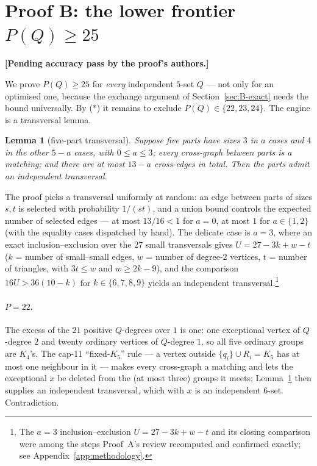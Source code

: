 \documentclass[11pt,reqno]{amsart}
\newtheorem{lemma}[theorem]{Lemma}
\theoremstyle{definition}
\theoremstyle{remark}
\newcommand{\capeleven}{\textsf{cap-11}}
\newcommand{\pendingB}{%
  \par\nobreak\smallskip\noindent
  \textbf{[Pending accuracy pass by the proof's authors.]}\par\smallskip}
\begin{document}
\section{Proof B: the lower frontier \texorpdfstring{$P(Q)\ge 25$}{P(Q)>=25}}\label{sec:B-lower}
\pendingB

We prove $P(Q)\ge 25$ for \emph{every} independent $5$-set $Q$ --- not only for an
optimised one, because the exchange argument of Section~\ref{sec:B-exact} needs the bound
universally. By ($\ast$) it remains to exclude $P(Q)\in\{22,23,24\}$. The engine is a
transversal lemma.

\begin{lemma}[five-part transversal]\label{lem:B-fivepart}
Suppose five parts have sizes $3$ in $a$ cases and $4$ in the other $5-a$ cases, with
$0\le a\le 3$; every cross-graph between parts is a matching; and there are at most
$13-a$ cross-edges in total. Then the parts admit an independent transversal.
\end{lemma}

The proof picks a transversal uniformly at random: an edge between parts of sizes $s,t$ is
selected with probability $1/(st)$, and a union bound controls the expected number of
selected edges --- at most $13/16<1$ for $a=0$, at most $1$ for $a\in\{1,2\}$ (with the
equality cases dispatched by hand). The delicate case is $a=3$, where an exact
inclusion--exclusion over the $27$ small transversals gives $U=27-3k+w-t$ ($k$ = number of
small--small edges, $w$ = number of degree-$2$ vertices, $t$ = number of triangles, with
$3t\le w$ and $w\ge 2k-9$), and the comparison $16U>36(10-k)$ for $k\in\{6,7,8,9\}$ yields
an independent transversal.\footnote{The $a=3$ inclusion--exclusion $U=27-3k+w-t$ and its
closing comparison were among the steps Proof~A's review recomputed and confirmed exactly;
see Appendix~\ref{app:methodology}.}

\paragraph{$P=22$.} The excess of the $21$ positive $Q$-degrees over $1$ is one: one
exceptional vertex of $Q$-degree $2$ and twenty ordinary vertices of $Q$-degree $1$, so
all five ordinary groups are $K_4$'s. The \capeleven{} ``fixed-$K_5$'' rule --- a vertex
outside $\{q_i\}\cup R_i=K_5$ has at most one neighbour in it --- makes every cross-graph
a matching and lets the exceptional $x$ be deleted from the (at most three) groups it
meets; Lemma~\ref{lem:B-fivepart} then supplies an independent transversal, which with $x$
is an independent $6$-set. Contradiction.
\end{document}
